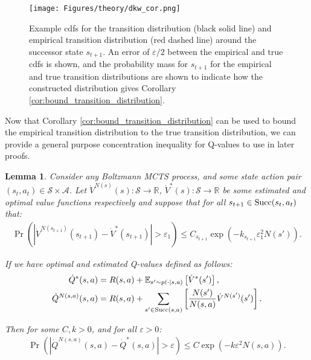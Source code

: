 \documentclass{article}
\newcommand{\bb}[1]{\mathbb{#1}}
\newcommand{\cl}[1]{\mathcal{#1}}
\newcommand{\succc}[2]{\textnormal{Succ}(#1,#2)}
\theoremstyle{plain}
\newtheorem{lemma}[theorem]{Lemma}
\begin{document}
\begin{appendices}
        \begin{figure}
            \centering
            \texttt{[image: Figures/theory/dkw\_cor.png]}
            \caption{Example cdfs for the transition distribution (black solid line) and empirical transition distribution (red dashed line) around the successor state $s_{t+1}$. An error of $\varepsilon/2$ between the empirical and true cdfs is shown, and the probability mass for $s_{t+1}$ for the empirical and true transition distributions are shown to indicate how the constructed distribution gives Corollary \ref{cor:bound_transition_distribution}.}
            \label{fig:dkw_diag}
        \end{figure}
    
    






    
    
        Now that Corollary \ref{cor:bound_transition_distribution} can be used to bound  the empirical transition distribution to the true transition distribution, we can provide a general purpose concentration inequality for Q-values to use in later proofs.
        
        \begin{lemma} \label{lem:stochastic_step}
            Consider any Boltzmann MCTS process, and some state action pair $(s_t,a_t)\in\cl{S}\times\cl{A}$. Let $\dot{V}^{N(s)}(s):\cl{S}\rightarrow \bb{R}$, $\dot{V}^*(s):\cl{S}\rightarrow \bb{R}$ be some estimated and optimal value functions respectively and suppose that for all $s_{t+1}\in\succc{s_t}{a_t}$ that:
            \begin{align}
                \Pr\left(\left| \dot{V}^{N(s_{t+1})}(s_{t+1}) - \dot{V}^*(s_{t+1}) \right| > \varepsilon_1 \right) \leq C_{s_{t+1}}\exp(-k_{s_{t+1}}\varepsilon_1^2 N(s')).
            \end{align}
            
            If we have optimal and estimated Q-values defined as follows: 
            \begin{align}
                \dot{Q}^*(s,a)&=R(s,a)+\bb{E}_{s'\sim p(\cdot|s,a)}\left[\dot{V}^*(s')\right], \\
                \dot{Q}^{N(s,a)}(s,a)&=R(s,a)+\sum_{s'\in\succc{s}{a}} \left[\frac{N(s')}{N(s,a)} \dot{V}^{N(s')}(s')\right].
            \end{align}
            
            Then for some $C,k>0$, and for all $\varepsilon>0$:
            \begin{align}
                \Pr\left(\left| \dot{Q}^{N(s,a)}(s,a) - \dot{Q}^*(s,a) \right| > \varepsilon \right) \leq C\exp(-k\varepsilon^2 N(s,a)).
            \end{align}
        \end{lemma}
        

\end{appendices}
\end{document}
